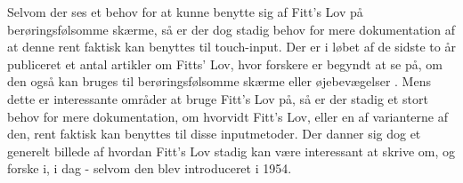 Selvom der ses et behov for at kunne benytte sig af Fitt's Lov på berøringsfølsomme skærme, så er der dog stadig behov for mere dokumentation af at denne rent faktisk kan benyttes til touch-input. Der er i løbet af de sidste to år publiceret et antal artikler om Fitts' Lov, hvor forskere er begyndt at se på, om den også kan bruges til berøringsfølsomme skærme eller øjebevægelser \cite{hong2015} \cite{zhao2015} \cite{jiang2014} \cite{greene2014}. Mens dette er interessante områder at bruge Fitt's Lov på, så er der stadig et stort behov for mere dokumentation, om hvorvidt Fitt's Lov, eller en af varianterne af den, rent faktisk kan benyttes til disse inputmetoder. Der danner sig dog et generelt billede af hvordan Fitt's Lov stadig kan være interessant at skrive om, og forske i, i dag - selvom den blev introduceret i 1954.\\


